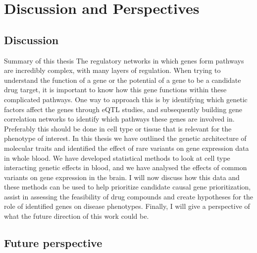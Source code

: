 \chapter{Discussion and Perspectives}
\label{chap:discussion}

{ \Large {} }

\newpage

\section{Discussion}

Summary of this thesis
The regulatory networks in which genes form pathways are incredibly complex, with many layers of regulation. When trying to understand the function of a gene or the potential of a gene to be a candidate drug target, it is important to know how this gene functions within these complicated pathways. One way to approach this is by identifying which genetic factors affect the genes through eQTL studies, and subsequently building gene correlation networks to identify which pathways these genes are involved in. Preferably this should be done in cell type or tissue that is relevant for the phenotype of interest. In this thesis we have outlined the genetic architecture of molecular traits and identified the effect of rare variants on gene expression data in whole blood. We have developed statistical methods to look at cell type interacting genetic effects in blood, and we have analysed the effects of common variants on gene expression in the brain. I will now discuss how this data and these methods can be used to help prioritize candidate causal gene prioritization, assist in assessing the feasibility of drug compounds and create hypotheses for the role of identified genes on disease phenotypes. Finally, I will give a perspective of what the future direction of this work could be. 

\section{Future perspective}

